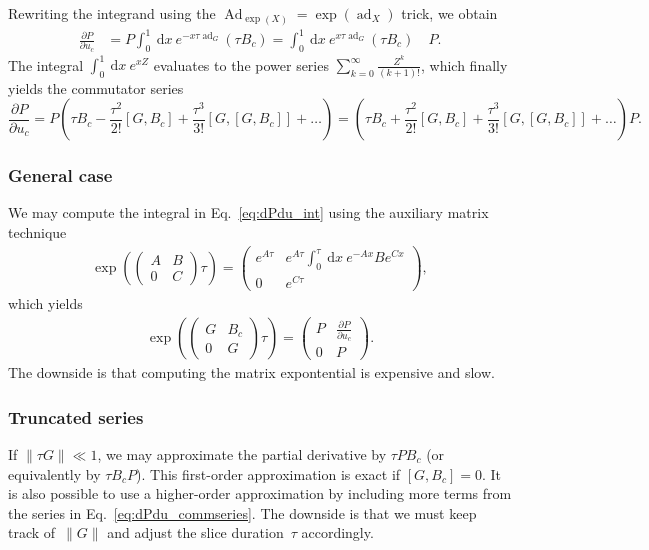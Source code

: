 \documentclass[aps, pra, a4paper, longbibliography, superscriptaddress]{revtex4-1}
\newcommand{\be}{\begin{equation}}
\newcommand{\ee}{\end{equation}}
\newcommand{\comm}[2]{\left[ #1, #2 \right]}
\DeclareMathOperator{\Ad}{Ad}
\DeclareMathOperator{\ad}{ad}
\newcommand{\dd}[2]{\frac{\partial #1}{\partial #2}}
\newcommand{\wrt}[1]{\:\mathrm{d}#1\:} %
\begin{document}
Rewriting the integrand using the $\Ad_{\exp(X)} = \exp(\ad_X)$ trick,
we obtain
\begin{align}
\dd{P}{u_{c}}
&=
P
\int_0^1 \wrt{x}
e^{-x \tau \ad_{G}}
(\tau B_c)
=
\int_0^1 \wrt{x}
e^{x \tau \ad_{G}}
(\tau B_c)
\quad P.
\end{align}
The integral 
$\int_0^1 \wrt{x} e^{x Z}$
evaluates to the power series
$\sum_{k=0}^\infty \frac{Z^k}{(k+1)!}$,
which finally yields the commutator series
\be
\label{eq:dPdu_commseries}
\dd{P}{u_{c}}
= P \left(\tau B_c -\frac{\tau^2}{2!}\comm{G}{B_c}
+\frac{\tau^3}{3!}\comm{G}{\comm{G}{B_c}}
+\ldots \right)
= \left(\tau B_c +\frac{\tau^2}{2!}\comm{G}{B_c}
+\frac{\tau^3}{3!}\comm{G}{\comm{G}{B_c}}
+\ldots \right) P.
\ee

\subsubsection{General case}

We may compute the integral in Eq.~\eqref{eq:dPdu_int}
using the auxiliary matrix technique
\begin{align}
\exp \left(
\begin{pmatrix}
A & B\\
0 & C
\end{pmatrix} \tau\right)
=
\begin{pmatrix}
e^{A \tau} &
e^{A \tau} \int_0^\tau \wrt{x} e^{-A x} B e^{C x}
\\
0 & e^{C \tau}
\end{pmatrix},
\end{align}
which yields
\begin{align}
\exp \left(
\begin{pmatrix}
G & B_c\\
0 & G
\end{pmatrix} \tau\right)
=
\begin{pmatrix}
P & \dd{P}{u_c}\\
0 & P
\end{pmatrix}.
\end{align}
The downside is that computing the matrix expontential is expensive and slow.

\subsubsection{Truncated series}

If $\|\tau G\| \ll 1$, we may approximate the partial derivative by
$\tau P B_c$ (or equivalently by $\tau B_c P$).
This first-order approximation is exact if $\comm{G}{B_c} = 0$.
It is also possible to use a higher-order approximation by including
more terms from the series in Eq.~\eqref{eq:dPdu_commseries}.
The downside is that we must keep track of~$\|G\|$ and adjust the
slice duration~$\tau$ accordingly.
\end{document}
